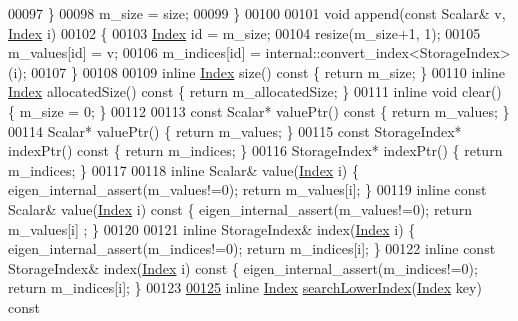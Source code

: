 \begin{DoxyCode}
00097       \}
00098       m\_size = size;
00099     \}
00100 
00101     \textcolor{keywordtype}{void} append(\textcolor{keyword}{const} Scalar& v, \hyperlink{namespace_eigen_a62e77e0933482dafde8fe197d9a2cfde}{Index} i)
00102     \{
00103       \hyperlink{namespace_eigen_a62e77e0933482dafde8fe197d9a2cfde}{Index} \textcolor{keywordtype}{id} = m\_size;
00104       resize(m\_size+1, 1);
00105       m\_values[id] = v;
00106       m\_indices[id] = internal::convert\_index<StorageIndex>(i);
00107     \}
00108 
00109     \textcolor{keyword}{inline} \hyperlink{namespace_eigen_a62e77e0933482dafde8fe197d9a2cfde}{Index} size()\textcolor{keyword}{ const }\{ \textcolor{keywordflow}{return} m\_size; \}
00110     \textcolor{keyword}{inline} \hyperlink{namespace_eigen_a62e77e0933482dafde8fe197d9a2cfde}{Index} allocatedSize()\textcolor{keyword}{ const }\{ \textcolor{keywordflow}{return} m\_allocatedSize; \}
00111     \textcolor{keyword}{inline} \textcolor{keywordtype}{void} clear() \{ m\_size = 0; \}
00112 
00113     \textcolor{keyword}{const} Scalar* valuePtr()\textcolor{keyword}{ const }\{ \textcolor{keywordflow}{return} m\_values; \}
00114     Scalar* valuePtr() \{ \textcolor{keywordflow}{return} m\_values; \}
00115     \textcolor{keyword}{const} StorageIndex* indexPtr()\textcolor{keyword}{ const }\{ \textcolor{keywordflow}{return} m\_indices; \}
00116     StorageIndex* indexPtr() \{ \textcolor{keywordflow}{return} m\_indices; \}
00117 
00118     \textcolor{keyword}{inline} Scalar& value(\hyperlink{namespace_eigen_a62e77e0933482dafde8fe197d9a2cfde}{Index} i) \{ eigen\_internal\_assert(m\_values!=0); \textcolor{keywordflow}{return} m\_values[i]; \}
00119     \textcolor{keyword}{inline} \textcolor{keyword}{const} Scalar& value(\hyperlink{namespace_eigen_a62e77e0933482dafde8fe197d9a2cfde}{Index} i)\textcolor{keyword}{ const }\{ eigen\_internal\_assert(m\_values!=0); \textcolor{keywordflow}{return} m\_values[i]
      ; \}
00120 
00121     \textcolor{keyword}{inline} StorageIndex& index(\hyperlink{namespace_eigen_a62e77e0933482dafde8fe197d9a2cfde}{Index} i) \{ eigen\_internal\_assert(m\_indices!=0); \textcolor{keywordflow}{return} m\_indices[i]; \}
00122     \textcolor{keyword}{inline} \textcolor{keyword}{const} StorageIndex& index(\hyperlink{namespace_eigen_a62e77e0933482dafde8fe197d9a2cfde}{Index} i)\textcolor{keyword}{ const }\{ eigen\_internal\_assert(m\_indices!=0); \textcolor{keywordflow}{return} 
      m\_indices[i]; \}
00123 
\hyperlink{class_eigen_1_1internal_1_1_compressed_storage_ad96105b5ab19886e96076513eab77da5}{00125}     \textcolor{keyword}{inline} \hyperlink{namespace_eigen_a62e77e0933482dafde8fe197d9a2cfde}{Index} \hyperlink{class_eigen_1_1internal_1_1_compressed_storage_ad96105b5ab19886e96076513eab77da5}{searchLowerIndex}(\hyperlink{namespace_eigen_a62e77e0933482dafde8fe197d9a2cfde}{Index} key)\textcolor{keyword}{ const}

\end{DoxyCode}
